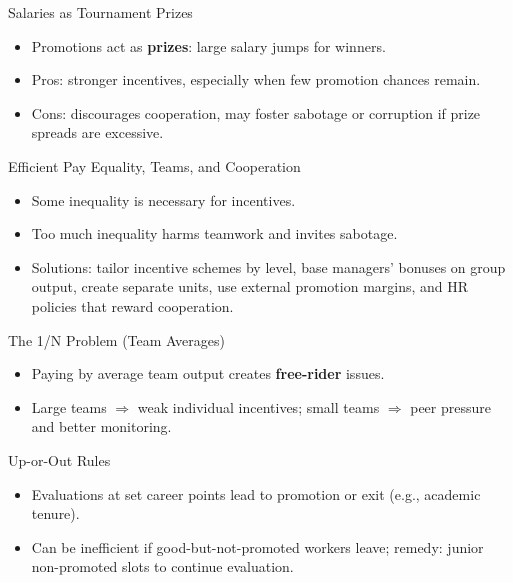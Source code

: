 \documentclass[aspectratio=169]{beamer}
\begin{document}
\begin{frame}{Salaries as Tournament Prizes}
\transfade
\begin{itemize}[<+->]
  \item Promotions act as \textbf{prizes}: large salary jumps for winners.
  \item Pros: stronger incentives, especially when few promotion chances remain.
  \item Cons: discourages cooperation, may foster sabotage or corruption if prize spreads are excessive.
\end{itemize}
\end{frame}

\begin{frame}{Efficient Pay Equality, Teams, and Cooperation}
\transfade
\begin{itemize}[<+->]
  \item Some inequality is necessary for incentives.
  \item \alert{Too much inequality} harms teamwork and invites sabotage.
  \item Solutions: tailor incentive schemes by level, base managers' bonuses on group output, create separate units, use external promotion margins, and HR policies that reward cooperation.
\end{itemize}
\end{frame}

\begin{frame}{The 1/N Problem (Team Averages)}
\transfade
\begin{itemize}[<+->]
  \item Paying by average team output creates \textbf{free-rider} issues.
  \item Large teams $\Rightarrow$ weak individual incentives; small teams $\Rightarrow$ peer pressure and better monitoring.
\end{itemize}
\end{frame}

\begin{frame}{Up-or-Out Rules}
\transfade
\begin{itemize}[<+->]
  \item Evaluations at set career points lead to promotion or exit (e.g., academic tenure).
  \item Can be inefficient if good-but-not-promoted workers leave; remedy: junior non-promoted slots to continue evaluation.
\end{itemize}
\end{frame}
\end{document}
